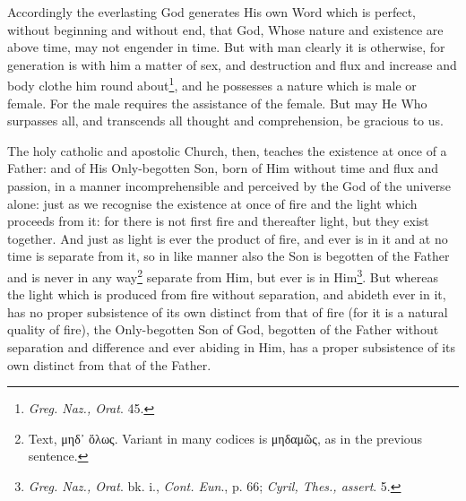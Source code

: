 Accordingly the everlasting God generates His own Word which is perfect, without beginning and without end, that God, Whose nature and existence are above time, may not engender in time. But with man clearly it is otherwise, for generation is with him a matter of sex, and destruction and flux and increase and body clothe him round about\footnote{\emph{Greg. Naz., Orat}. 45.}, and he possesses a nature which is male or female. For the male requires the assistance of the female. But may He Who surpasses all, and transcends all thought and comprehension, be gracious to us.

The holy catholic and apostolic Church, then, teaches the existence at once of a Father: and of His Only-begotten Son, born of Him without time and flux and passion, in a manner incomprehensible and perceived by the God of the universe alone: just as we recognise the existence at once of fire and the light which proceeds from it: for there is not first fire and thereafter light, but they exist together. And just as light is ever the product of fire, and ever is in it and at no time is separate from it, so in like manner also the Son is begotten of the Father and is never in any way\footnote{Text, \textgreek{μηδ᾽ ὅλως}. Variant in many codices is \textgreek{μηδαμῶς}, as in the previous sentence.} separate from Him, but ever is in Him\footnote{\emph{Greg. Naz., Orat}. bk. i., \emph{Cont. Eun}., p. 66; \emph{Cyril, Thes., assert}. 5.}. But whereas the light which is produced from fire without separation, and abideth ever in it, has no proper subsistence of its own distinct from that of fire (for it is a natural quality of fire), the Only-begotten Son of God, begotten of the Father without separation and difference and ever abiding in Him, has a proper subsistence of its own distinct from that of the Father.

